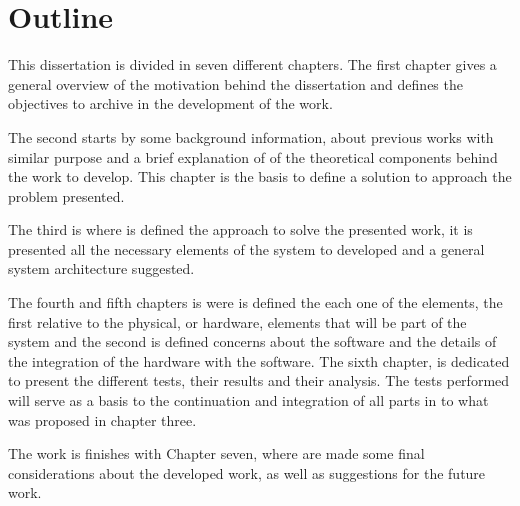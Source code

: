 

\section{Outline}
This dissertation is divided in seven different chapters. The first chapter gives a general overview of the motivation behind the dissertation and defines the objectives to archive in the development of the work. 

The second starts by some background information, about previous works with similar purpose and a brief explanation of of the theoretical components behind the work to develop. This chapter is the basis to define a solution to approach the problem presented.

The third is where is defined the approach to solve the presented work, it is presented all the necessary elements of the system to developed and a general system architecture suggested.

The fourth and fifth chapters is were is defined the each one of the elements, the first relative to the physical, or hardware, elements that will be part of the system and the second is defined concerns about the software and the details of the integration of the hardware with the software.
The sixth chapter, is dedicated to present the different tests, their results and their analysis. The tests performed will serve as a basis to the continuation and integration of all parts in to what was proposed in chapter three. 

The work is finishes with Chapter seven, where are made some final considerations about the developed work, as well as suggestions for the future work.
\clearpage
